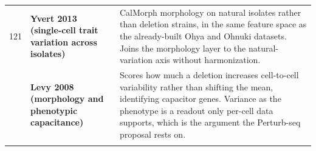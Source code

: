 \begin{longtable}{@{}r@{\hspace{4pt}} L{46mm} L{112mm}@{}}
121 & \textbf{Yvert 2013 (single-cell trait variation across isolates)} & CalMorph morphology on natural isolates rather than deletion strains, in the same feature space as the already-built Ohya and Ohnuki datasets. Joins the morphology layer to the natural-variation axis without harmonization. \\
 & \textbf{Levy 2008 (morphology and phenotypic capacitance)} & Scores how much a deletion increases cell-to-cell variability rather than shifting the mean, identifying capacitor genes. Variance as the phenotype is a readout only per-cell data supports, which is the argument the Perturb-seq proposal rests on. \\
\addlinespace[5pt]
\addlinespace[4pt]
\end{longtable}
\endgroup
